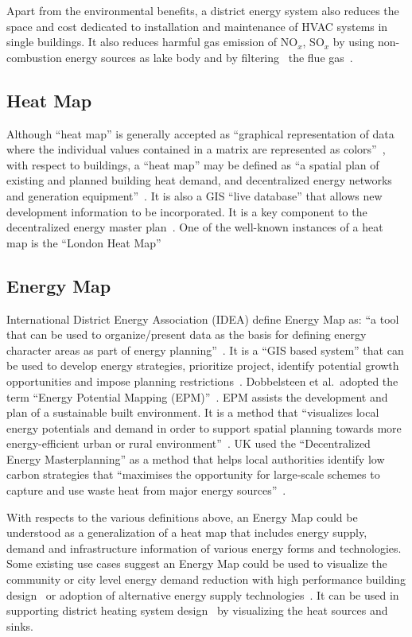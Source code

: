 Apart from the environmental benefits, a district energy system also
reduces the space and cost dedicated to installation and maintenance
of HVAC systems in single buildings. It also reduces harmful gas
emission of NO$_x$, SO$_x$ by using non-combustion energy sources as
lake body and by filtering~\cite{IDEA2012} the flue
gas~\cite{veolia2014}.

\subsection{Heat Map}
Although ``heat map'' is generally accepted as ``graphical
representation of data where the individual values contained in a
matrix are represented as colors''~\cite{HeatmapWiki}, with respect to
buildings, a ``heat map'' may be defined as ``a spatial plan of
existing and planned building heat demand, and decentralized energy
networks and generation equipment''~\cite{decentralHeatMap2011}. It is
also a GIS ``live database'' that allows new development information
to be incorporated. It is a key component to the decentralized energy
master plan~\cite{decentralHeatMap2011}. One of the well-known
instances of a heat map is the ``London Heat
Map''~\cite{londonHeatMap}

\subsection{Energy Map}
International District Energy Association (IDEA) define Energy Map as:
``a tool that can be used to organize/present data as the basis for
defining energy character areas as part of energy
planning''~\cite{IDEA2012}. It is a ``GIS based system'' that can be
used to develop energy strategies, prioritize project, identify
potential growth opportunities and impose planning
restrictions~\cite{IDEA2012}. Dobbelsteen et al.\ adopted the term
``Energy Potential Mapping (EPM)''~\cite{Dobbelsteen2013}. EPM assists
the development and plan of a sustainable built environment. It is a
method that ``visualizes local energy potentials and demand in order
to support spatial planning towards more energy-efficient urban or
rural environment''~\cite{Dobbelsteen2013}. UK used the
``Decentralized Energy Masterplanning'' as a method that helps local
authorities identify low carbon strategies that ``maximises the
opportunity for large-scale schemes to capture and use waste heat from
major energy sources''~\cite{decentralHeatMap2011}.

With respects to the various definitions above, an Energy Map could be
understood as a generalization of a heat map that includes energy
supply, demand and infrastructure information of various energy forms
and technologies. Some existing use cases suggest an Energy Map could
be used to visualize the community or city level energy demand
reduction with high performance building design~\cite{aacip2009} or
adoption of alternative energy supply
technologies~\cite{aacip2009}. It can be used in supporting district
heating system design~\cite{decentralHeatMap2011, Finney2012165} by
visualizing the heat sources and sinks.

